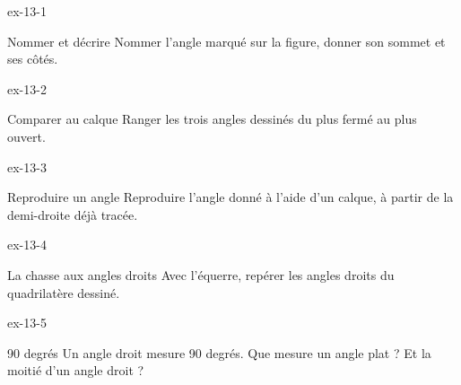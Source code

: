 \clearpage{}
\begin{blocLivre}{ex-13-1}\begin{exercice}[1]{Nommer et décrire}
Nommer l’angle marqué sur la figure, donner son sommet et ses côtés.
\label{fig-ex-13-1}
\end{exercice}\end{blocLivre}
\begin{blocLivre}{ex-13-2}\begin{exercice}[1]{Comparer au calque}
Ranger les trois angles dessinés du plus fermé au plus ouvert.
\label{fig-ex-13-2}
\end{exercice}\end{blocLivre}
\begin{blocLivre}{ex-13-3}\begin{exercice}[1]{Reproduire un angle}
Reproduire l’angle donné à l’aide d’un calque, à partir de la demi-droite déjà tracée.
\label{fig-ex-13-3}
\end{exercice}\end{blocLivre}
\begin{blocLivre}{ex-13-4}\begin{exercice}[1]{La chasse aux angles droits}
Avec l’équerre, repérer les angles droits du quadrilatère dessiné.
\label{fig-ex-13-4}
\end{exercice}\end{blocLivre}
\begin{blocLivre}{ex-13-5}\begin{exercice}[1]{90 degrés}
Un angle droit mesure 90 degrés. Que mesure un angle plat ? Et la moitié d’un angle droit ?
\end{exercice}\end{blocLivre}

